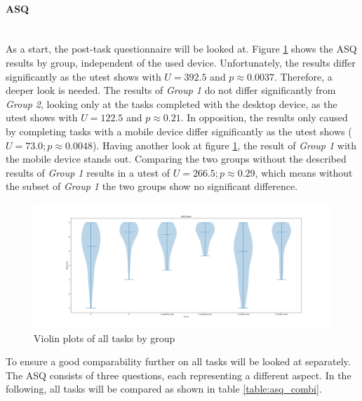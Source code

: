 \paragraph{ASQ}\mbox{}\\
As a start, the \gls{post-task} questionnaire will be looked at. 
Figure \ref{fig:asq_group} shows the ASQ results by group, independent of the used device.
Unfortunately, the results differ significantly as the \gls{utest} shows with $U=392.5$ and $p \approx 0.0037$.
Therefore, a deeper look is needed. 
The results of \textit{Group 1} do not differ significantly from \textit{Group 2}, looking only at the tasks completed with the desktop device, as the \gls{utest} shows with $U=122.5$ and $p \approx 0.21$.
In opposition, the results only caused by completing tasks with a mobile device differ significantly as the \gls{utest} shows ($U=73.0;p \approx 0.0048$).
Having another look at figure \ref{fig:asq_group}, the result of \textit{Group 1} with the mobile device stands out. 
Comparing the two groups without the described results of \textit{Group 1} results in a \gls{utest} of $U=266.5; p \approx 0.29$, which means without the subset of \textit{Group 1} the two groups show no significant difference.

\begin{figure}
  \hspace*{-1.5in}
  \centering
  \includegraphics*[width=1.15\textwidth]{Evaluation/img/group_asq_violin.png}
  \caption{Violin plots of all tasks by group}
  \label{fig:asq_group}
\end{figure}

To ensure a good comparability further on all tasks will be looked at separately. 
The \gls{ASQ} consists of three questions, each representing a different aspect.
In the following, all tasks will be compared as shown in table \ref{table:asq_combi}.

